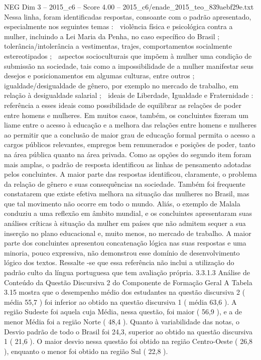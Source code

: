 \begin{textsample}{NEG Dim 3 – 2015\_c6 – Score 4.00 – 2015\_c6/enade\_2015\_teo\_839aebf29e.txt}
Nessa linha, foram identificadas respostas, consoante com o padrão apresentado, especialmente nos seguintes temas :  violência física e psicológica contra a mulher, incluindo a Lei Maria da Penha, no caso específico do Brasil ;  tolerância/intolerância a vestimentas, trajes, comportamentos socialmente estereotipados ;  aspectos socioculturais que impõem à mulher uma condição de submissão na sociedade, tais como a impossibilidade de a mulher manifestar seus desejos e posicionamentos em algumas culturas, entre outros ;  igualdade/desigualdade de gênero, por exemplo no mercado de trabalho, em relação à desigualdade salarial ;  ideais de Liberdade, Igualdade e Fraternidade : referência a esses ideais como possibilidade de equilibrar as relações de poder entre homens e mulheres.
Em muitos casos, também, os concluintes fizeram um liame entre o acesso à educação e a melhora das relações entre homens e mulheres ao permitir que a conclusão de maior grau de educação formal permita o acesso a cargos públicos relevantes, empregos bem remunerados e posições de poder, tanto na área pública quanto na área privada.
Como as opções do segundo item foram mais amplas, o padrão de resposta identificou as linhas de pensamento adotadas pelos concluintes.
A maior parte das respostas identificou, claramente, o problema da relação de gênero e suas consequências na sociedade.
Também foi frequente constatarem que existe efetiva melhora na situação das mulheres no Brasil, mas que tal movimento não ocorre em todo o mundo.
Aliás, o exemplo de Malala conduziu a uma reflexão em âmbito mundial, e os concluintes apresentaram suas análises críticas à situação da mulher em países que não admitem sequer a sua inserção no plano educacional e, muito menos, no mercado de trabalho.
A maior parte dos concluintes apresentou concatenação lógica nas suas respostas e uma minoria, pouco expressiva, não demonstrou esse domínio de desenvolvimento lógico dos textos.
Ressalte -se que essa referência não inclui a utilização do padrão culto da língua portuguesa que tem avaliação própria. 3.3.1.3 Análise de Conteúdo da Questão Discursiva 2 do Componente de Formação Geral A Tabela 3.15 mostra que o desempenho médio dos estudantes na questão discursiva 2 ( média 55,7 ) foi inferior ao obtido na questão discursiva 1 ( média 63,6 ).
A região Sudeste foi aquela cuja Média, nessa questão, foi maior ( 56,9 ), e a de menor Média foi a região Norte ( 48,4 ).
Quanto à variabilidade das notas, o Desvio padrão de todo o Brasil foi 24,3, superior ao obtido na questão discursiva 1 ( 21,6 ).
O maior desvio nessa questão foi obtido na região Centro-Oeste ( 26,8 ), enquanto o menor foi obtido na região Sul ( 22,8 ).

\end{textsample}
